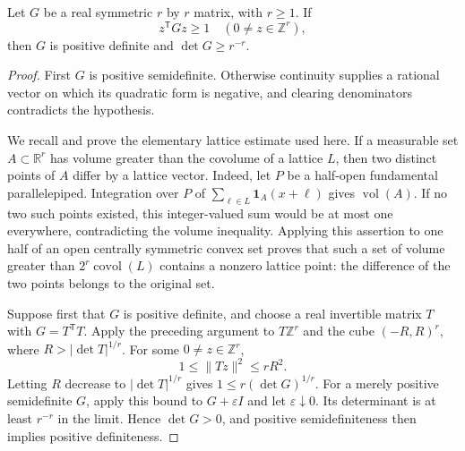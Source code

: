 \begin{lemma}\label{ac-positive-gram}
Let $G$ be a real symmetric $r$ by $r$ matrix, with $r\ge1$.
If
\[
                 z^{\mathsf T}Gz\ge1
       \quad(0\ne z\in\mathbb Z^r),
\]
then $G$ is positive definite and $\det G\ge r^{-r}$.
\end{lemma}
\begin{proof}
First $G$ is positive semidefinite.  Otherwise continuity supplies
a rational vector on which its quadratic form is negative, and
clearing denominators contradicts the hypothesis.

We recall and prove the elementary lattice estimate used here.
If a measurable set $A\subset\mathbb R^r$ has volume greater than
the covolume of a lattice $L$, then two distinct points of $A$
differ by a lattice vector.  Indeed, let $P$ be a half-open
fundamental parallelepiped.  Integration over $P$ of
$\sum_{\ell\in L}\mathbf1_A(x+\ell)$ gives $\operatorname{vol}(A)$.
If no two such points existed, this integer-valued sum would be at
most one everywhere, contradicting the volume inequality.
Applying this assertion to one half of an open centrally symmetric
convex set proves that such a set of volume greater than
$2^r\operatorname{covol}(L)$ contains a nonzero lattice point:
the difference of the two points belongs to the original set.

Suppose first that $G$ is positive definite, and choose a real
invertible matrix $T$ with $G=T^{\mathsf T}T$.  Apply the preceding
argument to $T\mathbb Z^r$ and the cube $(-R,R)^r$, where
$R>|\det T|^{1/r}$.  For some $0\ne z\in\mathbb Z^r$,
\[
                  1\le\|Tz\|^2\le rR^2.
\]
Letting $R$ decrease to $|\det T|^{1/r}$ gives
$1\le r(\det G)^{1/r}$.  For a merely positive semidefinite $G$,
apply this bound to $G+\varepsilon I$ and let
$\varepsilon\downarrow0$.  Its determinant is at least $r^{-r}$
in the limit.  Hence $\det G>0$, and positive semidefiniteness
then implies positive definiteness.
\end{proof}

